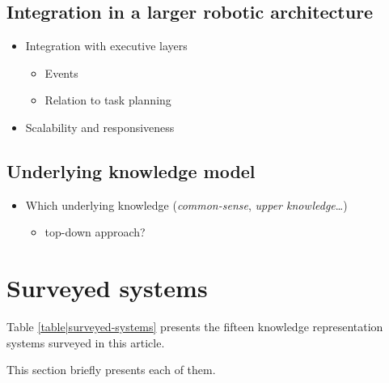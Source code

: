 \documentclass[a4paper]{article}
\begin{document}
\subsection{Integration in a larger robotic architecture}

\begin{itemize}

	\item  Integration with executive layers
	\begin{itemize}
		\item  Events
		\item  Relation to task planning
	\end{itemize}

	\item  Scalability and responsiveness
\end{itemize}

\subsection{Underlying knowledge model}

\begin{itemize}
	\item  Which underlying knowledge (\emph{common-sense}, \emph{upper knowledge}\ldots{})
	\begin{itemize}
		\item  top-down approach?
	\end{itemize}

\end{itemize}

\section{Surveyed systems}

Table \ref{table|surveyed-systems} presents the fifteen knowledge representation systems surveyed
in this article.

This section briefly presents each of them.
\end{document}
